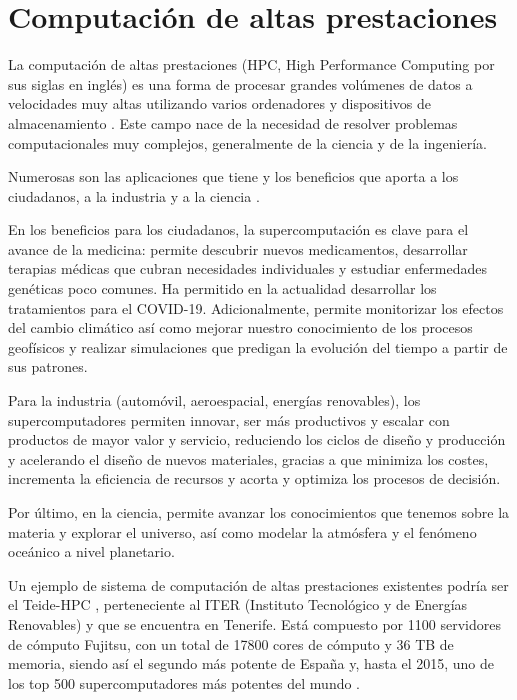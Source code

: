 \section{Computación de altas prestaciones}
\vspace{2mm}
La computación de altas prestaciones (HPC, High Performance Computing por sus siglas en inglés) es una forma de procesar grandes volúmenes de datos a velocidades muy altas utilizando varios ordenadores y dispositivos de almacenamiento \cite{hpccomputing}. Este campo nace de la necesidad de resolver problemas computacionales muy complejos, generalmente de la ciencia y de la ingeniería. 
\vspace{2mm}

\vspace{2mm}
Numerosas son las aplicaciones que tiene \cite{hpcexamples} y los beneficios que aporta a los ciudadanos, a la industria y a la ciencia \cite{benefitscomputing}.
\vspace{4mm}

En los beneficios para los ciudadanos, la supercomputación es clave para el avance de la medicina: permite descubrir nuevos medicamentos, desarrollar terapias médicas que cubran necesidades individuales y estudiar enfermedades genéticas poco comunes. Ha permitido en la actualidad desarrollar los tratamientos para el COVID-19. Adicionalmente, permite monitorizar los efectos del cambio climático así como mejorar nuestro conocimiento de los procesos geofísicos y realizar simulaciones que predigan la evolución del tiempo a partir de sus patrones.

\vspace{2mm}
Para la industria (automóvil, aeroespacial, energías renovables), los supercomputadores permiten innovar, ser más productivos y escalar con productos de mayor valor y servicio, reduciendo los ciclos de diseño y producción y acelerando el diseño de nuevos materiales, gracias a que minimiza los costes, incrementa la eficiencia de recursos y acorta y optimiza los procesos de decisión.
\vspace{2mm}

Por último, en la ciencia, permite avanzar los conocimientos que tenemos sobre la materia y explorar el universo, así como modelar la atmósfera y el fenómeno oceánico a nivel planetario.
\vspace{4mm}

Un ejemplo de sistema de computación de altas prestaciones existentes podría ser el Teide-HPC \cite{teidehpc}, perteneciente al ITER (Instituto Tecnológico y de Energías Renovables) y que se encuentra en Tenerife. Está compuesto por 1100 servidores de cómputo Fujitsu, con un total de 17800 cores de cómputo y 36 TB de memoria, siendo así el segundo más potente de España y, hasta el 2015, uno de los top 500 supercomputadores más potentes del mundo \cite{teidehpcranking}.
\vspace{2mm}

